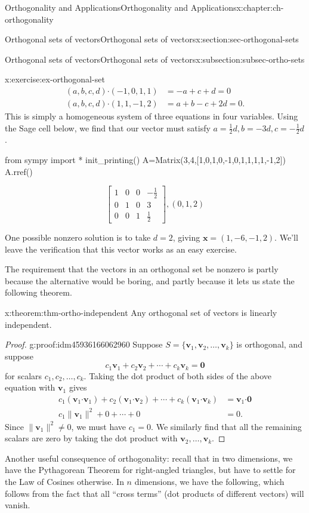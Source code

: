 \documentclass[oneside,10pt,]{book}
\numberwithin{equation}{section}
\newcommand{\bbm}{\begin{bmatrix}}
\newcommand{\ebm}{\end{bmatrix}}
\newcommand{\dotp}{\!\boldsymbol{\cdot}\!}
\newcommand{\len}[1]{\lVert #1\rVert}
\newcommand{\vv}{\mathbf{v}}
\newcommand{\xx}{\mathbf{x}}
\newcommand{\amp}{&}
\begin{document}
\begin{chapterptx}{Orthogonality and Applications}{}{Orthogonality and Applications}{}{}{x:chapter:ch-orthogonality}
\begin{sectionptx}{Orthogonal sets of vectors}{}{Orthogonal sets of vectors}{}{}{x:section:sec-orthogonal-sets}
\begin{subsectionptx}{Orthogonal sets of vectors}{}{Orthogonal sets of vectors}{}{}{x:subsection:subsec-ortho-sets}
\begin{inlineexercise}{}{x:exercise:ex-orthogonal-set}
\begin{align*}
(a,b,c,d)\dotp (-1,0,1,1) \amp = -a+c+d=0 \\
(a,b,c,d)\dotp (1,1,-1,2) \amp = a+b-c+2d=0\text{.}
\end{align*}
This is simply a homogeneous system of three equations in four variables. Using the Sage cell below, we find that our vector must satisfy \(a=\frac12 d, b = -3d, c=-\frac12 d\).%
\begin{sageinput}
from sympy import *
init_printing()
A=Matrix(3,4,[1,0,1,0,-1,0,1,1,1,1,-1,2])
A.rref()
\end{sageinput}
\begin{sageoutput}
\[\bbm 1\amp 0\amp 0\amp -\frac12\\ 0\amp 1\amp 0\amp 3\\ 0\amp 0\amp 1\amp \frac12\ebm, (0,1,2)\]
\end{sageoutput}
One possible nonzero solution is to take \(d=2\), giving \(\xx=(1,-6,-1,2)\). We'll leave the verification that this vector works as an easy exercise.%
\end{inlineexercise}%
The requirement that the vectors in an orthogonal set be nonzero is partly because the alternative would be boring, and partly because it lets us state the following theorem.%
\begin{theorem}{}{}{x:theorem:thm-ortho-independent}%
Any orthogonal set of vectors is linearly independent.%
\end{theorem}
\begin{proof}{}{g:proof:idm45936166062960}
Suppose \(S=\{\vv_1,\vv_2,\ldots, \vv_k\}\) is orthogonal, and suppose%
\begin{equation*}
c_1\vv_1+c_2\vv_2+\cdots + c_k\vv_k = \mathbf{0}
\end{equation*}
for scalars \(c_1,c_2,\ldots, c_k\). Taking the dot product of both sides of the above equation with \(\vv_1\) gives%
\begin{align*}
c_1(\vv_1\dotp \vv_1)+c_2(\vv_1\dotp \vv_2)+\cdots +c_k(\vv_1\dotp \vv_k) \amp =\vv_1\dotp \mathbf{0}\\
c_1\len{\vv_1}^2+0+\cdots + 0\amp = 0 \text{.}
\end{align*}
Since \(\len{\vv_1}^2\neq 0\), we must have \(c_1=0\). We similarly find that all the remaining scalars are zero by taking the dot product with \(\vv_2,\ldots, \vv_k\).%
\end{proof}
Another useful consequence of orthogonality: recall that in two dimensions, we have the Pythagorean Theorem for right-angled triangles, but have to settle for the Law of Cosines otherwise. In \(n\) dimensions, we have the following, which follows from the fact that all ``cross terms'' (dot products of different vectors) will vanish.%

\end{subsectionptx}
\end{sectionptx}
\end{chapterptx}
\end{document}
